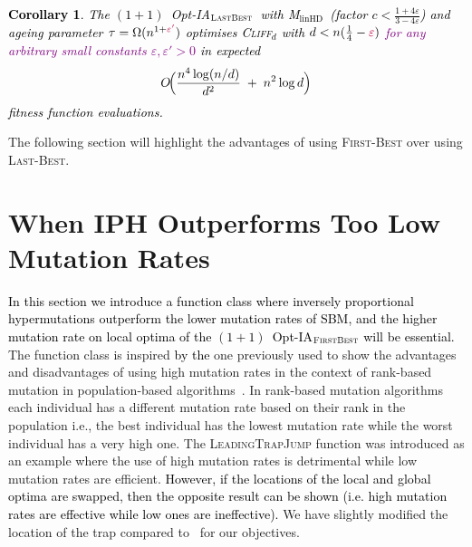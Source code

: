 \documentclass[lettersize,journal]{IEEEtran}
\newcommand{\new}[1]{\textcolor{black}{#1}}
\newcommand{\rev}[1]{\textcolor{black}{#1}}
\newcommand{\rerev}[1]{\textcolor{purple}{#1}}
\newcommand{\cliff}{\textsc{Cliff}$_d$}
\newcommand{\linHD}{M$_{\text{linHD}}$}
\newcommand{\lastBest}{$(1+1)$~Opt-IA$_{\textsc{LastBest}}$}
\newtheorem{corollary}{Corollary}
\begin{document}
{\textcolor{black}{
\begin{corollary}
	The \textcolor{black}{\lastBest~with} \linHD\ \new{(factor $c<\tfrac{1+4\varepsilon}{3-4\varepsilon}$)} and ageing parameter $\tau=\Omega(n^{1+\rerev{\varepsilon'}})$
	optimises \cliff{} with $d<n(\tfrac{1}{4}-\rerev{\varepsilon})$ \rerev{for any arbitrary small constants $\varepsilon,\varepsilon'>0$} in expected
	\[
	O\!\Big(\frac{\rev{n^{4}}\log(n/d)}{d^{2}} \;+\; n^{2}\log d\Big)
	\]
	fitness function evaluations.
\end{corollary}
}
The following section will highlight the advantages of using \textsc{First-Best} over using \textsc{Last-Best}.
 }
 
 
 
\section{When IPH Outperforms Too Low Mutation Rates}\label{sec:ltj}
\new{In this section we introduce a function class where inversely proportional hypermutations outperform the lower mutation rates of SBM, and the higher mutation rate on local optima of the $(1+1)$~Opt-IA$_{\textsc{FirstBest}}$ will be essential.}
The function class is inspired \rev{by the} one previously used to show the advantages and disadvantages of using high mutation rates in the context of rank-based mutation in population-based algorithms~\cite{OlivetoLehreNeumann09}.
In rank-based mutation algorithms~\cite{RankBasedMutation} each individual has a different mutation rate based on their rank in the population i.e., the best individual has the lowest mutation rate while the worst individual has a very high one.
The \textsc{LeadingTrapJump} function was introduced as an example where the use of high mutation rates is detrimental while low mutation rates are efficient. \new{However, if the locations of the local and global optima are swapped, then the opposite result can be shown (i.e. high mutation rates are effective while low ones are ineffective).}
We have slightly modified the location of the trap compared to~\cite{OlivetoLehreNeumann09} for our objectives. 
\end{document}
